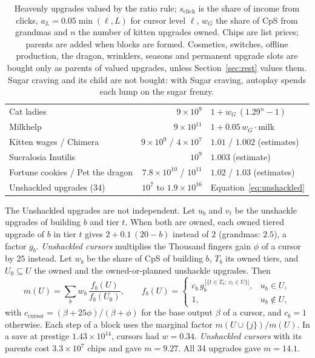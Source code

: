 \documentclass[11pt,a4paper]{article}
\numberwithin{equation}{section}
\theoremstyle{definition}
\theoremstyle{remark}
\begin{document}
\begin{table}[t]
\begin{tabular}{@{}lrl@{}}
Cat ladies & $9\times10^{9}$ & $1+w_G\,(1.29^{n}-1)$ \\
Milkhelp & $9\times10^{11}$ & $1+0.05\,w_G\cdot\text{milk}$ \\
Kitten wages / Chimera & $9\times10^{9}$ / $4\times10^{7}$ & $1.01$ / $1.002$ (estimates) \\
Sucralosia Inutilis & $10^{9}$ & $1.003$ (estimate) \\
Fortune cookies / Pet the dragon & $7.8\times10^{10}$ / $10^{11}$ & $1.02$ / $1.03$ (estimates) \\
Unshackled upgrades (34) & $10^{7}$ to $1.9\times10^{16}$ & Equation~\eqref{eq:unshackled} \\
\bottomrule
\end{tabular}
\caption{Heavenly upgrades valued by the ratio rule; $s_{\mathrm{click}}$ is the share of income from clicks, $a_L=0.05\min(\ell,L)$ for cursor level $\ell$, $w_G$ the share of CpS from grandmas and $n$ the number of kitten upgrades owned. Chips are list prices; parents are added when blocks are formed. Cosmetics, switches, offline production, the dragon, wrinklers, seasons and permanent upgrade slots are bought only as parents of valued upgrades, unless Section~\ref{sec:rest} values them. Sugar craving and its child are not bought: with Sugar craving, autoplay spends each lump on the sugar frenzy.}
\label{tab:heavenly}
\end{table}

The Unshackled upgrades are not independent. Let $u_b$ and $v_t$ be the unshackle upgrades of building $b$ and tier $t$. When both are owned, each owned tiered upgrade of $b$ in tier $t$ gives $2+0.1\,(20-b)$ instead of $2$ (grandmas: $2.5$), a factor $g_b$. \emph{Unshackled cursors} multiplies the Thousand fingers gain $\phi$ of a cursor by $25$ instead. Let $w_b$ be the share of CpS of building $b$, $T_b$ its owned tiers, and $U_0\subseteq U$ the owned and the owned-or-planned unshackle upgrades. Then
\begin{equation}\label{eq:unshackled}
 m(U)=\sum_b w_b\,\frac{f_b(U)}{f_b(U_0)},\qquad
 f_b(U)=\begin{cases} c_b\,g_b^{\,|\{t\in T_b:\ v_t\in U\}|}, & u_b\in U,\\ 1, & u_b\notin U,\end{cases}
\end{equation}
with $c_{\mathrm{cursor}}=(\beta+25\phi)/(\beta+\phi)$ for the base output $\beta$ of a cursor, and $c_b=1$ otherwise. Each step of a block uses the marginal factor $m(U\cup\{j\})/m(U)$. In a save at prestige $1.43\times10^{14}$, cursors had $w=0.34$. \emph{Unshackled cursors} with its parents cost $3.3\times10^{7}$ chips and gave $m=9.27$. All 34 upgrades gave $m=14.1$.
\end{document}
